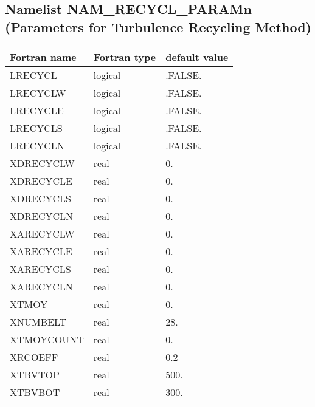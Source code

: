 \subsection{Namelist NAM\_RECYCL\_PARAMn (Parameters for Turbulence Recycling Method)}
\begin{longtable} {|p{}|p{}|p{}|}
\hline
Fortran name &  Fortran type & default value \\
\hline 
\endhead
\hline
\endfoot
LRECYCL              & logical       & .FALSE.       \\
LRECYCLW             & logical       & .FALSE.       \\
LRECYCLE             & logical       & .FALSE.       \\
LRECYCLS             & logical       & .FALSE.       \\
LRECYCLN             & logical       & .FALSE.       \\
XDRECYCLW            & real          & 0.            \\
XDRECYCLE            & real          & 0.            \\
XDRECYCLS            & real          & 0.            \\
XDRECYCLN            & real          & 0.            \\
XARECYCLW            & real          & 0.            \\
XARECYCLE            & real          & 0.            \\
XARECYCLS            & real          & 0.            \\
XARECYCLN            & real          & 0.            \\
XTMOY                & real          & 0.            \\
XNUMBELT             & real          & 28.           \\
XTMOYCOUNT           & real          & 0.            \\
XRCOEFF              & real          & 0.2           \\
XTBVTOP              & real          & 500.          \\
XTBVBOT              & real          & 300.          \\
\end{longtable}

